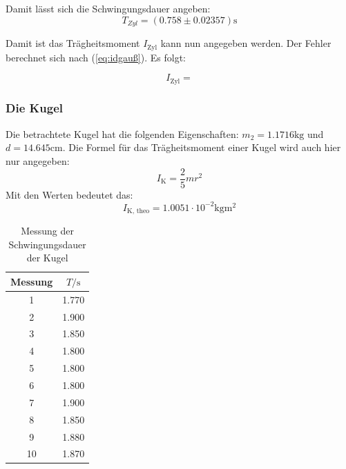 Damit lässt sich die Schwingungsdauer angeben:
\begin{equation*}
  T_{Zyl} = (0.758 \pm 0.02357) \unit{\second}
\end{equation*}


Damit ist das Trägheitsmoment $I_{\text{Zyl}}$ kann nun angegeben werden.
Der Fehler berechnet sich nach (\ref{eq:idgauß}). Es folgt:


\begin{equation*}
  I_{\text{Zyl}} = 
\end{equation*}


\subsubsection*{Die Kugel}

Die betrachtete Kugel hat die folgenden Eigenschaften: $m_2 = 1.1716\unit{\kilo\gram}$ und $d = 14.645\unit{\centi\meter}$.
Die Formel für das Trägheitsmoment einer Kugel wird auch hier nur angegeben:
\begin{equation*}
  I_{\text{K}} = \frac{2}{5} m r^2
\end{equation*}
Mit den Werten bedeutet das:
\begin{equation*}
  I_{\text{K, theo}} = 1.0051 \cdot 10^{-2} \unit{\kilo\gram\meter\squared}
\end{equation*}

\begin{table}[H]
  \centering
  \caption{Messung der Schwingungsdauer der Kugel}
  \label{tab:SchwingungsdauerKugel}
  \begin{tabular}{c c}
    \toprule
    Messung &  $T / \unit\second$ \\
    \midrule
              1 &        1.770 \\
              2 &        1.900 \\
              3 &        1.850 \\
              4 &        1.800 \\
              5 &        1.800 \\
              6 &        1.800 \\
              7 &        1.900 \\
              8 &        1.850 \\
              9 &        1.880 \\
             10 &        1.870 \\
    \bottomrule
    \end{tabular}
\end{table}

